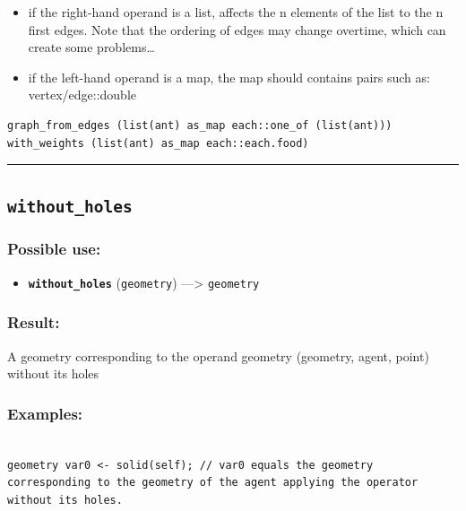 \documentclass[]{book}
\providecommand{\tightlist}{%
  \setlength{\itemsep}{0pt}\setlength{\parskip}{0pt}}
\theoremstyle{definition}
\theoremstyle{definition}
\theoremstyle{definition}
\theoremstyle{remark}
\begin{document}
\begin{itemize}
\tightlist
\item
  if the right-hand operand is a list, affects the n elements of the
  list to the n first edges. Note that the ordering of edges may change
  overtime, which can create some problems\ldots{}\\
\item
  if the left-hand operand is a map, the map should contains pairs such
  as: vertex/edge::double
\end{itemize}

\begin{verbatim}
graph_from_edges (list(ant) as_map each::one_of (list(ant))) with_weights (list(ant) as_map each::each.food) 
\end{verbatim}

\begin{center}\rule{0.5\linewidth}{\linethickness}\end{center}

\subsection{\texorpdfstring{\texttt{without\_holes}}{without\_holes}}\label{without_holes}

\subsubsection{Possible use:}\label{possible-use-563}

\begin{itemize}
\tightlist
\item
  \textbf{\texttt{without\_holes}} (\texttt{geometry}) ---\textgreater{}
  \texttt{geometry}
\end{itemize}

\subsubsection{Result:}\label{result-542}

A geometry corresponding to the operand geometry (geometry, agent,
point) without its holes

\subsubsection{Examples:}\label{examples-389}

\begin{verbatim}
 
geometry var0 <- solid(self); // var0 equals the geometry corresponding to the geometry of the agent applying the operator without its holes.
\end{verbatim}
\end{document}
